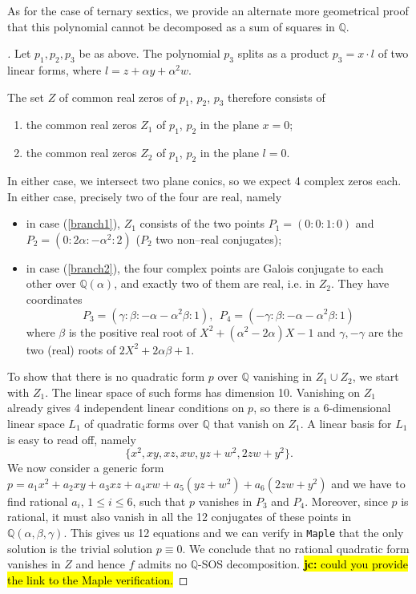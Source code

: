 \documentclass[a4paper,11pt]{amsart}%
\newcommand{\code}[1]{\texttt{#1}}
\newcommand\jc[1]{\hl{{\bf jc:} #1}}
\newcommand\Q{\mathbb{Q}}
\theoremstyle{definition}
\begin{document}
As for the case of ternary sextics, we provide an alternate more geometrical proof that this polynomial cannot be decomposed as a sum of squares in $\Q$.

\begin{proof}[]
Let $p_1, p_2, p_3$ be as above. The polynomial $p_3$ splits as a product $p_3 = x \cdot l$ of two linear forms,
where $l = z + \alpha y + \alpha^2 w$.

The set $Z$ of common real zeros of $p_1$, $p_2$, $p_3$ therefore consists of
\begin{enumerate}
\item \label{branch1} the common real zeros $Z_1$ of $p_1$, $p_2$ in the plane $x = 0$;
\item \label{branch2} the common real zeros $Z_2$ of $p_1$, $p_2$ in the plane $l = 0$.
\end{enumerate}

In either case, we intersect two plane conics, so we expect 4 complex zeros each. In
either case, precisely two of the four are real, namely
\begin{itemize}
\item in case (\ref{branch1}), $Z_1$ consists of the two points $P_1 = (0 : 0 : 1 : 0)$ and $P_2 = (0 : 2\alpha : -\alpha^2: 2)$ ($P_2$ two non--real conjugates);
\item in case (\ref{branch2}), the four complex points are Galois conjugate to each other over
$\Q(\alpha)$, and exactly two of them are real, i.e. in $Z_2$. They have coordinates
\[
P_3 =(\gamma:\beta:-\alpha-\alpha^2\beta:1), \ \
P_4 =(-\gamma:\beta:-\alpha-\alpha^2\beta:1)
\]
where $\beta$ is the positive real root of $X^2+(\alpha^2-2\alpha)X-1$ and $\gamma,-\gamma$ are the two (real)
roots of $2X^2+2\alpha\beta+1$.
\end{itemize}

To show that there is no quadratic form $p$ over $\Q$ vanishing in $Z_1 \cup Z_2$, we start
with $Z_1$. The linear space of such forms has dimension 10. Vanishing on $Z_1$ already gives 4 independent linear conditions on $p$, so
there is a 6-dimensional linear space $L_1$ of quadratic forms over $\Q$ that vanish on
$Z_1$. A linear basis for $L_1$ is easy to read off, namely
\[
\{x^2, xy, xz, xw, yz + w^2, 2zw +y^2\}.
\]
We now consider a generic form $p = a_1 x^2 + a_2 xy + a_3 xz + a_4 xw + a_5 (yz+w^2) + a_6 (2zw + y^2)$ and we have to find rational $a_i$, $1 \le i \le 6$, such that $p$ vanishes in $P_3$ and $P_4$. Moreover, since $p$ is rational, it must also vanish in all the 12 conjugates of these points in $\Q(\alpha, \beta, \gamma)$. This gives us 12 equations and we can verify in \code{Maple} that the only solution is the trivial solution $p \equiv 0$. We conclude that no rational quadratic form vanishes in $Z$ and hence $f$ admits no $\Q$-SOS decomposition. \jc{could you provide the link to the Maple verification.}
\end{proof}
\end{document}
